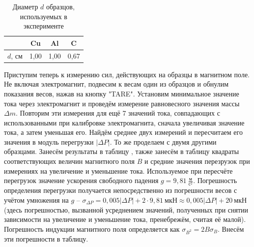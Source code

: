 \documentclass[a4paper,12pt]{article}
\begin{document}
\begin{table}[h]
	\centering
	\caption{Диаметр $d$ образцов, используемых в эксперименте} \label{Параметры}
	\begin{tabular}{|c|c|c|c|}
		\hline
		  & Cu & Al & C \\ \hline
		$d$, см & 1,00 & 1,00 & 0,67 \\ \hline
	\end{tabular}
\end{table}

Приступим теперь к измерению сил, действующих на образцы в магнитном поле. Не включая электромагнит, подвесим к весам один из образцов и обнулим показания весов, нажав на кнопку "TARE". Установим минимальное значение тока через электромагнит и проведём измерение равновесного значения массы $\Delta m$. Повторим эти измерения для ещё 7 значений тока, совпадающих с использованными при калибровке электромагнита, сначала увеличивая значение тока, а затем уменьшая его. Найдём среднее двух измерений и пересчитаем его значения в модуль перегрузки $\left|\Delta P\right|$. То же проделаем с двумя другими образцами. Занесём результаты в таблицу , также занесём в таблицу квадраты соответствующих величин магнитного поля $B$ и средние значения перезрузок при измерениях на увеличение и уменьшение тока. Используемое при пересчёте перегрузок значение ускорения свободного падения $g=9,81~\frac{\text{м}}{\text{с}^2}$. Погрешность определения перегрузки получается непосредственно из погрешности весов с учётом умножения на $g$ -- $\sigma_{\Delta P}=0,005\left|\Delta P\right|+2\cdot9,81~\text{мкН}\approx0,005\left|\Delta P\right|+20~\text{мкН}$ (здесь погрешностью, вызванной усреднением значений, полученных при снятии зависимости на увеличение и уменьшение тока, пренебрежём, считая её малой). Погрешность индукции магнитного поля определяется как $\sigma_{B^2}=2B\sigma_B$. Внесём эти погрешности в таблицу.
\end{document}
